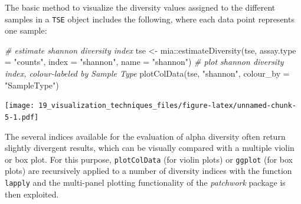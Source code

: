 \documentclass[
]{book}
\newenvironment{Shaded}{\begin{snugshade}}{\end{snugshade}}
\newcommand{\AttributeTok}[1]{\textcolor[rgb]{0.77,0.63,0.00}{#1}}
\newcommand{\CommentTok}[1]{\textcolor[rgb]{0.56,0.35,0.01}{\textit{#1}}}
\newcommand{\FunctionTok}[1]{\textcolor[rgb]{0.00,0.00,0.00}{#1}}
\newcommand{\NormalTok}[1]{#1}
\newcommand{\OtherTok}[1]{\textcolor[rgb]{0.56,0.35,0.01}{#1}}
\newcommand{\SpecialCharTok}[1]{\textcolor[rgb]{0.00,0.00,0.00}{#1}}
\newcommand{\StringTok}[1]{\textcolor[rgb]{0.31,0.60,0.02}{#1}}
\begin{document}
The basic method to visualize the diversity values assigned to the
different samples in a \texttt{TSE} object includes the following, where each
data point represents one sample:

\begin{Shaded}
\begin{Highlighting}[]
\CommentTok{\# estimate shannon diversity index}
\NormalTok{tse }\OtherTok{\textless{}{-}}\NormalTok{ mia}\SpecialCharTok{::}\FunctionTok{estimateDiversity}\NormalTok{(tse, }
                              \AttributeTok{assay.type =} \StringTok{"counts"}\NormalTok{,}
                              \AttributeTok{index =} \StringTok{"shannon"}\NormalTok{, }
                              \AttributeTok{name =} \StringTok{"shannon"}\NormalTok{)}
\CommentTok{\# plot shannon diversity index, colour{-}labeled by Sample Type}
\FunctionTok{plotColData}\NormalTok{(tse, }\StringTok{"shannon"}\NormalTok{, }\AttributeTok{colour\_by =} \StringTok{"SampleType"}\NormalTok{)}
\end{Highlighting}
\end{Shaded}

\texttt{[image: 19\_visualization\_techniques\_files/figure-latex/unnamed-chunk-5-1.pdf]}

The several indices available for the evaluation of alpha diversity
often return slightly divergent results, which can be visually
compared with a multiple violin or box plot. For this purpose,
\texttt{plotColData} (for violin plots) or \texttt{ggplot} (for box plots) are
recursively applied to a number of diversity indices with the function
\texttt{lapply} and the multi-panel plotting functionality of the \emph{patchwork}
package is then exploited.
\end{document}
